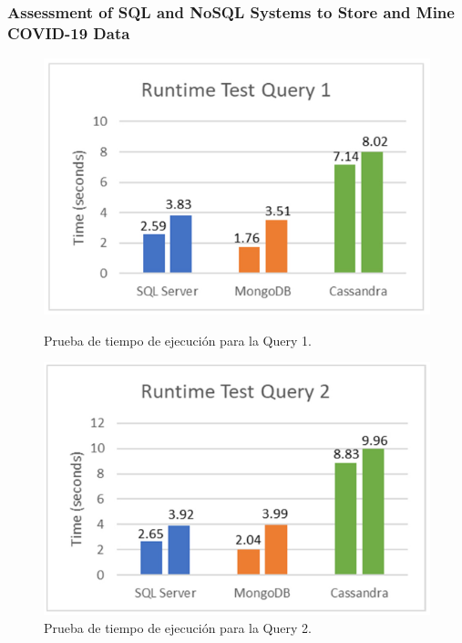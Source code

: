 \begin{frame}
    \frametitle{Assessment of SQL and NoSQL Systems to Store and Mine COVID-19 Data}

    \begin{figure}[H]
        \centering
        \begin{minipage}[b]{0.48\textwidth}
            \centering
            \includegraphics[width=\textwidth]{images/cov19-runt-test-q1.png}
            \caption{Prueba de tiempo de ejecución para la Query 1.}
        \end{minipage}
        \hfill
        \begin{minipage}[b]{0.48\textwidth}
            \centering
            \includegraphics[width=\textwidth]{images/cov19-runt-test-q2.png}
            \caption{Prueba de tiempo de ejecución para la Query 2.}
        \end{minipage}
    \end{figure}
\end{frame}

